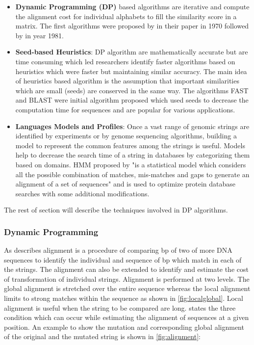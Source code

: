 \documentclass[12pt,twoside]{article}
\begin{document}
\begin{itemize}
    \item \textbf{Dynamic Programming (DP)} based algorithms are iterative and compute the alignment cost for individual alphabets
    to fill the similarity score in a matrix. The first algorithms were proposed  by \textcite{needleman_general_1970}
    in their paper in 1970 followed by \textcite{smith_identification_1981} in year 1981.    
    \item \textbf{Seed-based Heuristics}:  DP algorithm are mathematically accurate but are time consuming which led researchers
    identify faster algorithms based on heuristics which were faster but maintaining similar accuracy. The main idea of
    heuristics based algorithm is the assumption that important similarities which are small (seeds) are conserved in
    the same way. The algorithms FAST \cite{pearson_improved_1988} and BLAST \cite{altschul_basic_1990}
    were initial algorithm proposed which used seeds to decrease the computation time for sequences
    and are popular for various applications.
    \item \textbf{Languages Models and Profiles}: Once a vast range of genomic strings are identified by experiments or
    by genome sequencing algorithms, building a model to represent the common features among the strings is useful.
    Models help to decrease the search time of a string in databases by categorizing them based on domains. 
    HMM proposed by \textcite{hughey_hidden_1996} "is a statistical model which considers all the possible combination
    of matches, mis-matches and gaps to generate an alignment of a set of sequences" \cite{mount_bioinformatics:_2004}
    and is used to optimize protein database searches with some additional modifications.
    
\end{itemize}

The rest of section will describe the techniques involved in DP algorithms.

\subsubsection{Dynamic Programming}
\label{subsec:dp}

As \textcite[Chapter 3]{mount_bioinformatics:_2004} describes alignment is a procedure of comparing bp of two of more DNA sequences
to identify the individual and sequence of bp which match in each of the strings. The alignment can also be extended to
identify and estimate the cost of transformation of individual strings. Alignment is performed at two
levels. The global alignment is stretched over the entire sequence whereas the local alignment limits to strong matches within
the sequence as shown in \cref{fig:localglobal}. Local alignment is useful when the string to be compared are long.
\textcite{gokhale_reconfigurable_2010} states the three condition which can occur while estimating the alignment of sequences
at a given position. An example to show the mutation and corresponding global alignment of the original and the mutated
string is shown in \cref{fig:alignment}:
\end{document}
